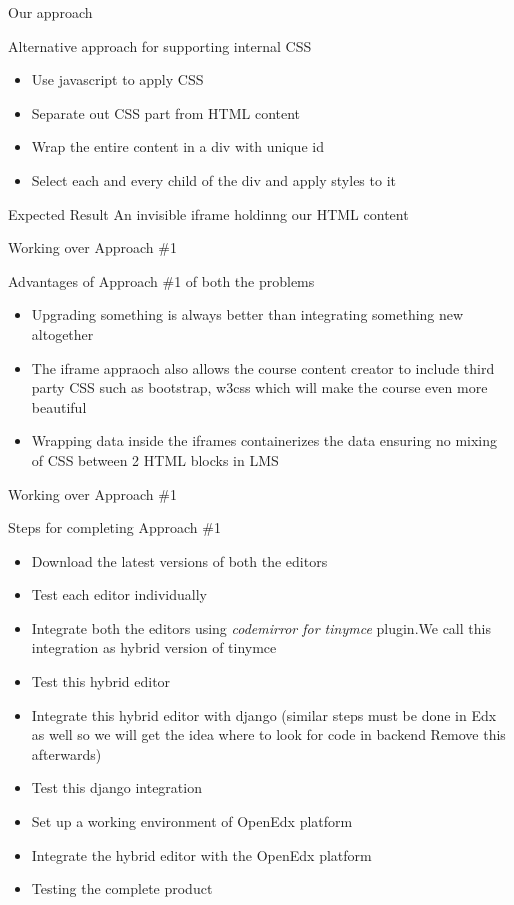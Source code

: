 \documentclass{beamer}
\begin{document}
	\begin{frame}{Our approach }
		\begin{block}{Alternative approach for supporting internal CSS }
			\begin{itemize}
				\item Use javascript to apply CSS
				\item Separate out CSS part from HTML content
				\item Wrap the entire content in a div with unique id
				\item Select each and every child of the div and apply styles to it
			\end{itemize}
		\end{block}
		\begin{block}{Expected Result}
			An invisible iframe holdinng our HTML content
		\end{block}
	\end{frame}
	
	\begin{frame}{Working over Approach \#1}
		\begin{block}{Advantages of Approach \#1 of both the problems}
			\begin{itemize}
				\item Upgrading something is always better than integrating something new altogether
				\item The iframe appraoch also allows the course content creator to include third party CSS such as bootstrap, w3css which will make the course even more beautiful
				\item Wrapping data inside the iframes containerizes the data ensuring no mixing of CSS between 2 HTML blocks in LMS
			\end{itemize}
		\end{block}
	\end{frame}
	
	\begin{frame}{Working over Approach \#1}
		\begin{block}{Steps for completing Approach \#1}
			\begin{itemize}
				\item Download the latest versions of both the editors
				\item Test each editor individually
				\item Integrate both the editors using \textit{codemirror for tinymce} plugin.We call this integration as hybrid version of tinymce
				\item Test this hybrid editor
				\item Integrate this hybrid editor with django (similar steps must be done in Edx as well so we will get the idea where to look for code in backend  Remove this afterwards)
				\item Test this django integration
				\item Set up a working environment of OpenEdx platform
				\item Integrate the hybrid editor with the OpenEdx platform
				\item Testing the complete product
			\end{itemize}
		\end{block}
	\end{frame}
	
\end{document}
